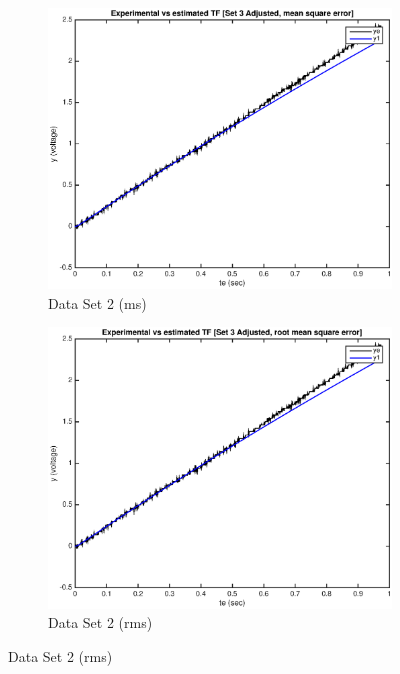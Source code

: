 \documentclass[11pt,a4paper]{article}
\begin{document}
\begin{enumerate}
\begin{figure}[H]
  \begin{subfigure}{0.5\textwidth}
  \includegraphics[width=0.9\linewidth]{Matlab_Figures/y2_dataset2_ms.eps} 
  \caption{Data Set 2 (ms)}
  \label{fig:subim1}
  \end{subfigure}
  \begin{subfigure}{0.5\textwidth}
  \includegraphics[width=0.9\linewidth]{Matlab_Figures/y2_dataset2_rms.eps}
  \caption{Data Set 2 (rms)}
  \label{fig:subim2}
  \end{subfigure}
  

\end{figure}
\end{enumerate}
\end{document}
